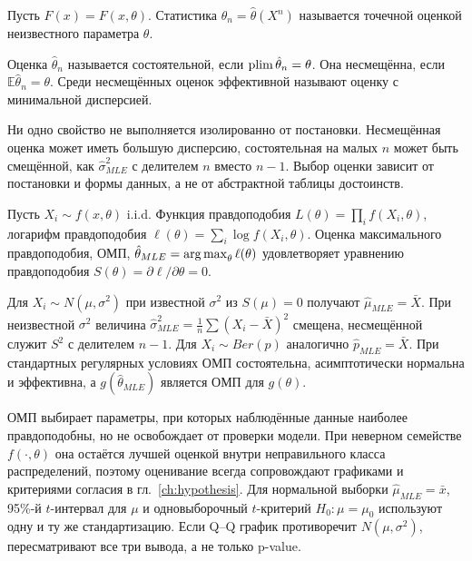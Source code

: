 \begin{definition}
Пусть $F(x)=F(x,\theta)$. Статистика $\hat\theta_n=\hat\theta(X^n)$ называется точечной оценкой неизвестного параметра $\theta$.
\end{definition}

\begin{definition}
Оценка $\hat\theta_n$ называется состоятельной, если $\operatorname*{\mathop{plim}}\hat\theta_n=\theta$. Она несмещённа, если $\mathbb{E}\hat\theta_n=\theta$. Среди несмещённых оценок эффективной называют оценку с минимальной дисперсией.
\end{definition}

Ни одно свойство не выполняется изолированно от постановки. Несмещённая оценка может иметь большую дисперсию, состоятельная на малых $n$ может быть смещённой, как $\hat\sigma^2_{MLE}$ с делителем $n$ вместо $n-1$. Выбор оценки зависит от постановки и формы данных, а не от абстрактной таблицы достоинств.

\begin{definition}
Пусть $X_i\sim f(x,\theta)$ i.i.d. Функция правдоподобия $L(\theta)=\prod_i f(X_i,\theta)$, логарифм правдоподобия $\ell(\theta)=\sum_i \log f(X_i,\theta)$. Оценка максимального правдоподобия, ОМП, $\hat\theta_{MLE}=\operatorname*{arg\,max}_\theta \ell(\theta)$ удовлетворяет уравнению правдоподобия $S(\theta)=\partial\ell/\partial\theta=0$.
\end{definition}

Для $X_i\sim N(\mu,\sigma^2)$ при известной $\sigma^2$ из $S(\mu)=0$ получают $\hat\mu_{MLE}=\bar X$. При неизвестной $\sigma^2$ величина $\hat\sigma^2_{MLE}=\frac1n\sum(X_i-\bar X)^2$ смещена, несмещённой служит $S^2$ с делителем $n-1$. Для $X_i\sim Ber(p)$ аналогично $\hat p_{MLE}=\bar X$. При стандартных регулярных условиях ОМП состоятельна, асимптотически нормальна и эффективна, а $g(\hat\theta_{MLE})$ является ОМП для $g(\theta)$.

ОМП выбирает параметры, при которых наблюдённые данные наиболее правдоподобны, но не освобождает от проверки модели. При неверном семействе $f(\cdot,\theta)$ она остаётся лучшей оценкой внутри неправильного класса распределений, поэтому оценивание всегда сопровождают графиками и критериями согласия в гл.~\ref{ch:hypothesis}. Для нормальной выборки $\hat\mu_{MLE}=\bar x$, 95\%-й $t$-интервал для $\mu$ и одновыборочный $t$-критерий $H_0\colon\mu=\mu_0$ используют одну и ту же стандартизацию. Если Q--Q график противоречит $N(\mu,\sigma^2)$, пересматривают все три вывода, а не только p-value.


